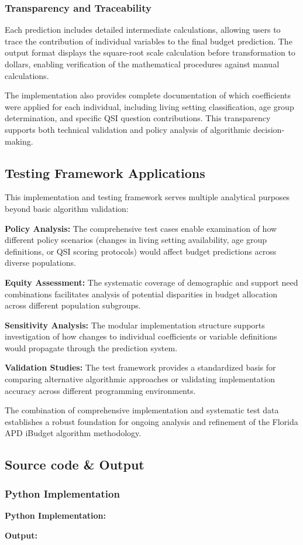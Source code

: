 \subsubsection{Transparency and Traceability}

Each prediction includes detailed intermediate calculations, allowing users to trace the contribution of individual variables to the final budget prediction. The output format displays the square-root scale calculation before transformation to dollars, enabling verification of the mathematical procedures against manual calculations.

The implementation also provides complete documentation of which coefficients were applied for each individual, including living setting classification, age group determination, and specific QSI question contributions. This transparency supports both technical validation and policy analysis of algorithmic decision-making.

\subsection{Testing Framework Applications}

This implementation and testing framework serves multiple analytical purposes beyond basic algorithm validation:

\textbf{Policy Analysis:} The comprehensive test cases enable examination of how different policy scenarios (changes in living setting availability, age group definitions, or QSI scoring protocols) would affect budget predictions across diverse populations.

\textbf{Equity Assessment:} The systematic coverage of demographic and support need combinations facilitates analysis of potential disparities in budget allocation across different population subgroups.

\textbf{Sensitivity Analysis:} The modular implementation structure supports investigation of how changes to individual coefficients or variable definitions would propagate through the prediction system.

\textbf{Validation Studies:} The test framework provides a standardized basis for comparing alternative algorithmic approaches or validating implementation accuracy across different programming environments.

The combination of comprehensive implementation and systematic test data establishes a robust foundation for ongoing analysis and refinement of the Florida APD iBudget algorithm methodology.

\subsection{Source code \& Output}

\subsubsection{Python Implementation}

\textbf{Python Implementation:}


\textbf{Output:}

